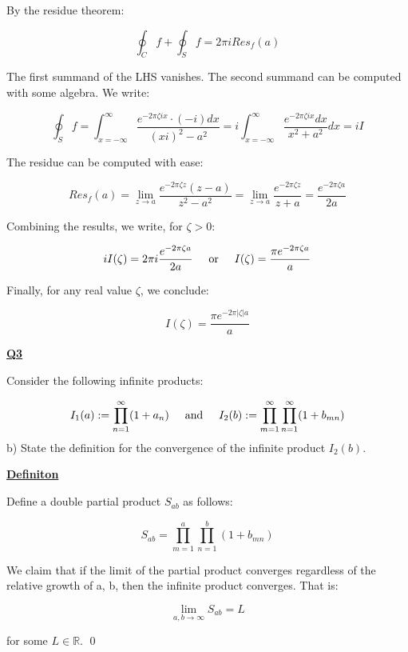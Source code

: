 \documentclass{article}
\newcommand{\new}[1]{
    \vspace{2mm}
    \noindent
    \textbf{
    \underline{#1}}
}
\newcommand{\textOr}{
    {
        \hspace{5mm}
        \textrm{or}
        \hspace{5mm}
    }
}
\newcommand{\textAnd}{
    {
        \hspace{5mm}
        \textrm{and}
        \hspace{5mm}
    }
}
\begin{document}
By the residue theorem:

\[
    \oint_C f + \oint_S f = 2\pi i Res_f(a)
\]

The first summand of the LHS vanishes. The second summand can 
be computed with some algebra. We write:

\[
\oint_S f = 
    \int_{x = -\infty}^{\infty}
    \frac{
        e^{-2\pi \zeta i x} \cdot (-i)dx
    }{ 
        (xi)^2 - a^2
    }
    = 
    i \int_{x = -\infty}^{\infty}
    \frac{e^{-2\pi \zeta i x} dx} 
    {x^2 + a^2}dx
    = iI
\]

The residue can be computed with ease:

\[
    Res_f(a) = 
    \lim_{z\rightarrow a} 
    \frac{e^{-2\pi \zeta z}(z-a)}{z^2-a^2}
    =
    \lim_{z\rightarrow a} 
    \frac{e^{-2 \pi \zeta z}}{z+a}
    =\frac{e^{-2 \pi \zeta a}}{2a}
\]

Combining the results, we write, for $\zeta > 0$:

\[
    iI(\zeta) = 2\pi i \frac{e^{-2 \pi \zeta a}}{2a}
    \textOr        I(\zeta) = \frac{\pi e^{-2 \pi \zeta a}}{a}
\]

Finally, for any real value $\zeta$, we 
conclude:

\[
    \boxed{
   I(\zeta) = \frac{\pi e^{-2 \pi |\zeta| a}}{a}  
    }
\]

\newpage
\vspace{5mm}
\new{Q3}
Consider the following infinite products:

\[
    I_1(a) := \prod_{n = 1}^\infty (1+a_n)
    \textAnd 
    I_2(b) := \prod_{m = 1}^\infty 
    \prod_{n = 1}^\infty(1 + b_{mn})
\]
b) State the definition for the convergence of the infinite product 
$I_2(b)$.

\new{Definiton} 
Define a double partial product $S_{ab}$ 
as follows:

\[
    S_{ab} = \prod_{m = 1}^a 
    \prod_{n = 1}^b(1 + b_{mn})
\]

We claim that if the limit of 
the partial product converges regardless 
of the relative growth of a, b, then 
the infinite product converges. That is:

\[
    \lim_{a, b\rightarrow \infty} 
    S_{ab} = L
\]

for some $L \in \mathbb{R}$. \qed 


\newpage 
\end{document}
